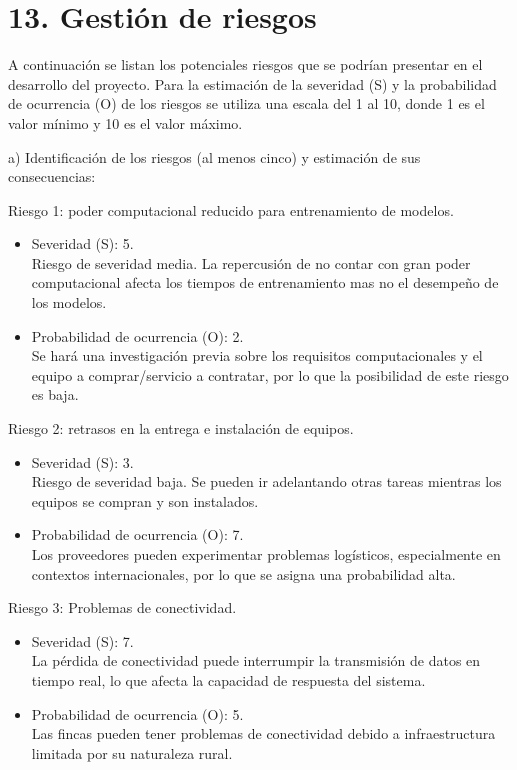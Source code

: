 \documentclass[
11pt, %
]{charter}
\begin{document}
\section{13. Gestión de riesgos}
\label{sec:riesgos}

A continuación se listan los potenciales riesgos que se podrían presentar en el desarrollo del proyecto. Para la estimación de la severidad (S) y la probabilidad de ocurrencia (O) de los riesgos se utiliza una escala del 1 al 10, donde 1 es el valor mínimo y 10 es el valor máximo.

a) Identificación de los riesgos (al menos cinco) y estimación de sus consecuencias:
 
Riesgo 1: poder computacional reducido para entrenamiento de modelos.
\begin{itemize}
	\item Severidad (S): 5. \\
	Riesgo de severidad media. La repercusión de no contar con gran poder computacional afecta los tiempos de entrenamiento mas no el desempeño de los modelos.
	\item Probabilidad de ocurrencia (O): 2. \\
	Se hará una investigación previa sobre los requisitos computacionales y el equipo a comprar/servicio a contratar, por lo que la posibilidad de este riesgo es baja.
\end{itemize}   

Riesgo 2: retrasos en la entrega e instalación de equipos.
\begin{itemize}
	\item Severidad (S): 3. \\
	Riesgo de severidad baja. Se pueden ir adelantando otras tareas mientras los equipos se compran y son instalados.
	\item Probabilidad de ocurrencia (O): 7. \\
	Los proveedores pueden experimentar problemas logísticos, especialmente en contextos internacionales, por lo que se asigna una probabilidad alta.
\end{itemize}

Riesgo 3: Problemas de conectividad.
\begin{itemize}
	\item Severidad (S):  7.\\
	La pérdida de conectividad puede interrumpir la transmisión de datos en tiempo real, lo que afecta la capacidad de respuesta del sistema.
	\item Probabilidad de ocurrencia (O): 5.\\
	Las fincas pueden tener problemas de conectividad debido a infraestructura limitada por su naturaleza rural.
\end{itemize}
\end{document}
